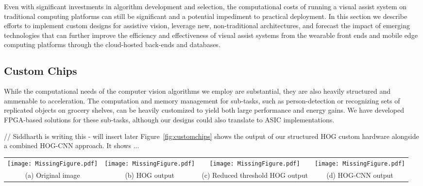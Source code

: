 Even with significant investments in algorithm development and
selection, the computational costs of running a visual assist system
on traditional computing platforms can still be significant and a
potential impediment to practical deployment. In this section we
describe efforts to implement custom designs for assistive vision,
leverage new, non-traditional architectures, and forecast the impact
of emerging technologies that can further improve the efficiency and
effectiveness of visual assist systems from the wearable front ends
and mobile edge computing platforms through the cloud-hosted back-ends
and databases.

\subsection{Custom Chips}
While the computational needs of the computer vision algorithms we
employ are substantial, they are also heavily structured and ammenable
to acceleration. The computation and memory management for sub-tasks,
such as person-detection or recognizing sets of replicated objects on
grocery shelves, can be heavily customized to yield both large
performance and energy gains. We have developed FPGA-based solutions
for these sub-tasks, although our designs could also translate to ASIC
implementations.

// Siddharth is writing this - will insert later
Figure~\ref{fig:customchips} shows the output of our structured HOG
custom hardware alongside a combined HOG-CNN approach. It shows ...

\begin{figure*}[!htb]
\centering
\begin{tabular}{@{}c@{} @{}c@{} @{}c@{} @{}c@{}}
\vspace{-5pt}
\texttt{[image: MissingFigure.pdf]} & \texttt{[image: MissingFigure.pdf]} & \texttt{[image: MissingFigure.pdf]} & \texttt{[image: MissingFigure.pdf]}\\[\abovecaptionskip]
\small(a) Original image & \small (b) HOG output & \small (c) Reduced threshold HOG output & \small (d) HOG-CNN output \\
\end{tabular}
\caption{Coupling structured features with learned features}
\label{fig:customchips}
\end{figure*}

